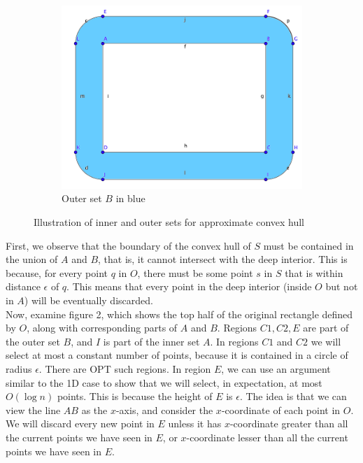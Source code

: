 \documentclass[12pt]{article}
\theoremstyle{definition}
\begin{document}
\begin{figure}[!htb]
\begin{subfigure}[b]{.4\linewidth}
\includegraphics[width=\linewidth]{outer_boundary}
\caption{Outer set $B$ in blue}\label{fig:tiger}
\end{subfigure}\hspace{20 mm}
\caption{Illustration of inner and outer sets for approximate convex hull}
\label{fig:animals}
\end{figure}

\noindent First, we observe that the boundary of the convex hull of $S$ must be contained in the union of $A$ and $B$, that is, it cannot intersect with the deep interior. This is because, for every point $q$ in $O$, there must be some point $s$ in $S$ that is within distance $\epsilon$ of $q$. This means that every point in the deep interior (inside $O$ but not in $A$) will be eventually discarded.
\\

\noindent Now, examine figure 2, which shows the top half of the original rectangle defined by $O$, along with corresponding parts of $A$ and $B$. Regions $C1, C2, E$ are part of the outer set $B$, and $I$ is part of the inner set $A$. In regions $C1$ and $C2$ we will select at most a constant number of points, because it is contained in a circle of radius $\epsilon$. There are OPT such regions. In region $E$, we can use an argument similar to the 1D case to show that we will select, in expectation, at most $O(\log{n})$ points. This is because the height of $E$ is $\epsilon$. The idea is that we can view the line $AB$ as the $x$-axis, and consider the $x$-coordinate of each point in $O$. We will discard every new point in $E$ unless it has $x$-coordinate greater than all the current points we have seen in $E$, or $x$-coordinate lesser than all the current points we have seen in $E$.
\\
\end{document}
